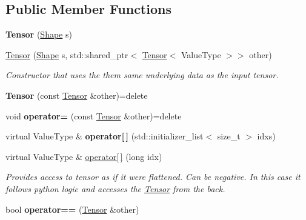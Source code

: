 \subsection*{Public Member Functions}
\begin{DoxyCompactItemize}
\item 
\mbox{\label{classTensor_a65505189656c9ffa74f6eb526abdb519}} 
{\bfseries Tensor} (\hyperlink{classShape}{Shape} s)
\item 
\mbox{\label{classTensor_aa5b4bb53587cf98068ebb2df2b1469ad}} 
\hyperlink{classTensor_aa5b4bb53587cf98068ebb2df2b1469ad}{Tensor} (\hyperlink{classShape}{Shape} s, std\+::shared\+\_\+ptr$<$ \hyperlink{classTensor}{Tensor}$<$ Value\+Type $>$$>$ other)
\begin{DoxyCompactList}\small\item\em Constructor that uses the them same underlying data as the input tensor. \end{DoxyCompactList}\item 
\mbox{\label{classTensor_aa56cee69dc4ff47337a0d163ba6cea81}} 
{\bfseries Tensor} (const \hyperlink{classTensor}{Tensor} \&other)=delete
\item 
\mbox{\label{classTensor_a74d22bed53c825f34ccf48c049d8f2c1}} 
void {\bfseries operator=} (const \hyperlink{classTensor}{Tensor} \&other)=delete
\item 
\mbox{\label{classTensor_a303ca3215d8bfe415e4c439d0c3191ff}} 
virtual Value\+Type \& {\bfseries operator\mbox{[}$\,$\mbox{]}} (std\+::initializer\+\_\+list$<$ size\+\_\+t $>$ idxs)
\item 
virtual Value\+Type \& \hyperlink{classTensor_a02fa9d476a6d1f85046380ef4eebbe34}{operator\mbox{[}$\,$\mbox{]}} (long idx)
\begin{DoxyCompactList}\small\item\em Provides access to tensor as if it were flattened. Can be negative. In this case it follows python logic and accesses the \hyperlink{classTensor}{Tensor} from the back. \end{DoxyCompactList}\item 
\mbox{\label{classTensor_a969b3b215515961f8e47d0b93784f8ce}} 
bool {\bfseries operator==} (\hyperlink{classTensor}{Tensor} \&other)
$$
\end{DoxyCompactItemize}
